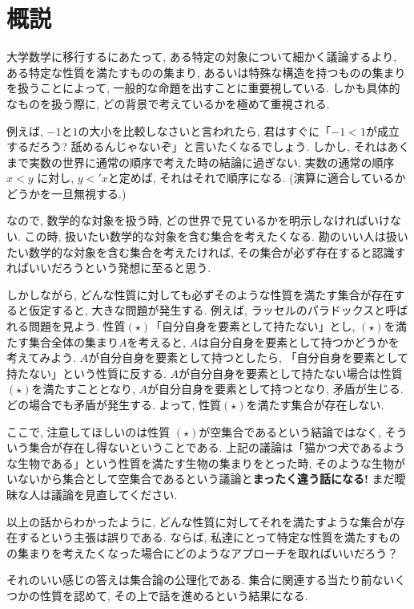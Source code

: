 \documentclass[lualatex]{ltjsbook}
\theoremstyle{remark}
\theoremstyle{plain}
\begin{document}
\chapter*{概説}

大学数学に移行するにあたって, ある特定の対象について細かく議論するより, ある特定な性質を満たすものの集まり, あるいは特殊な構造を持つものの集まりを扱うことによって, 一般的な命題を出すことに重要視している. しかも具体的なものを扱う際に, どの背景で考えているかを極めて重視される.

例えば, $-1$と$1$の大小を比較しなさいと言われたら, 君はすぐに「$-1 <1$が成立するだろう? 舐めるんじゃないぞ」と言いたくなるでしょう. しかし, それはあくまで実数の世界に通常の順序で考えた時の結論に過ぎない. 実数の通常の順序 $x < y$ に対し, $y <' x$と定めば, それはそれで順序になる. (演算に適合しているかどうかを一旦無視する.)



なので, 数学的な対象を扱う時, どの世界で見ているかを明示しなければいけない. この時, 扱いたい数学的な対象を含む集合を考えたくなる.
勘のいい人は扱いたい数学的な対象を含む集合を考えたければ, その集合が必ず存在すると認識すればいいだろうという発想に至ると思う.

しかしながら, どんな性質に対しても必ずそのような性質を満たす集合が存在すると仮定すると, 大きな問題が発生する. 
例えば, ラッセルのパラドックスと呼ばれる問題を見よう. 性質$(\star)$「自分自身を要素として持たない」とし, $(\star)$を満たす集合全体の集まり$A$を考えると, 
$A$は自分自身を要素として持つかどうかを考えてみよう. 
$A$が自分自身を要素として持つとしたら, 
「自分自身を要素として持たない」という性質に反する. 
$A$が自分自身を要素として持たない場合は性質$(\star)$を満たすこととなり, 
$A$が自分自身を要素として持つとなり, 矛盾が生じる. どの場合でも矛盾が発生する. よって, 性質$(\star)$を満たす集合が存在しない.


ここで, 注意してほしいのは性質 $(\star)$が空集合であるという結論ではなく, そういう集合が存在し得ないということである. 上記の議論は「猫かつ犬であるような生物である」という性質を満たす生物の集まりをとった時, そのような生物がいないから集合として空集合であるという議論と\textbf{まったく違う話になる!}
まだ曖昧な人は議論を見直してください.


以上の話からわかったように, どんな性質に対してそれを満たすような集合が存在するという主張は誤りである. ならば, 私達にとって特定な性質を満たすものの集まりを考えたくなった場合にどのようなアプローチを取ればいいだろう？

それのいい感じの答えは集合論の公理化である. 集合に関連する当たり前ないくつかの性質を認めて, その上で話を進めるという結果になる.
\end{document}
